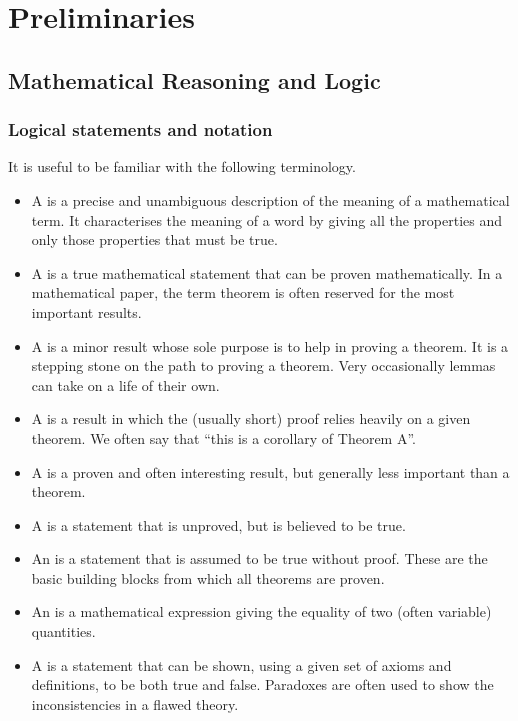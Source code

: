 \part{Preliminaries}
\chapter{Mathematical Reasoning and Logic}

\section{Logical statements and notation}
It is useful to be familiar with the following terminology.
\begin{itemize}
\item A  is a precise and unambiguous description of the meaning of a mathematical term. It characterises the meaning of a word by giving all the properties and only those properties that must be true.
\item A  is a true mathematical statement that can be proven mathematically. In a mathematical paper, the term theorem is often reserved for the most important results.
\item A  is a minor result whose sole purpose is to help in proving a theorem. It is a stepping stone on the path to proving a theorem. Very occasionally lemmas can take on a life of their own.
\item A  is a result in which the (usually short) proof relies heavily on a given theorem. We often say that ``this is a corollary of Theorem A''.
\item A  is a proven and often interesting result, but generally less important than a theorem.
\item A  is a statement that is unproved, but is believed to be true.
\item An  is a statement that is assumed to be true without proof. These are the basic building blocks from which all theorems are proven.
\item An  is a mathematical expression giving the equality of two (often variable) quantities.
\item A  is a statement that can be shown, using a given set of axioms and definitions, to be both true and false. Paradoxes are often used to show the inconsistencies in a flawed theory.
\end{itemize}

